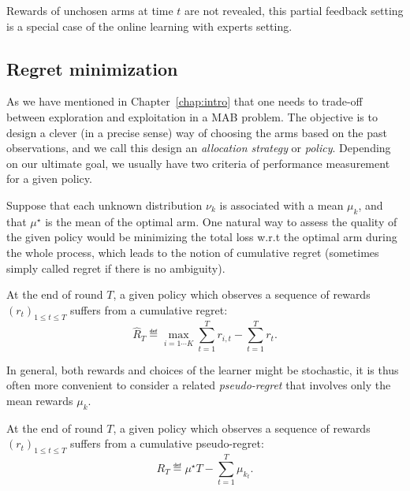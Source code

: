 \begin{remark}\label{remark:mab.partial}
\begin{leftbar}[remarkbar]
	Rewards of unchosen arms at time $t$ are not revealed, this partial feedback setting is a special case of the online learning with experts setting.
\end{leftbar}
\end{remark}

\subsection{Regret minimization}\label{sec:mab.model.regret}

As we have mentioned in Chapter~\ref{chap:intro} that one needs to trade-off between exploration and exploitation in a MAB problem. The objective is to design a clever (in a precise sense) way of choosing the arms based on the past observations, and we call this design an \emph{allocation strategy} or \emph{policy}. Depending on our ultimate goal, we usually have two criteria of performance measurement for a given policy.

Suppose that each unknown distribution $\nu_k$ is associated with a mean $\mu_k$, and that $\mu^{\star}$ is the mean of the optimal arm. One natural way to assess the quality of the given policy would be minimizing the total loss w.r.t the optimal arm during the whole process, which leads to the notion of \gls{cumulative regret} (sometimes simply called regret if there is no ambiguity).

\begin{definition}\label{def:mab.cumulative_regret}
\begin{leftbar}[defnbar]
	At the end of round $T$, a given policy which observes a sequence of rewards $(r_t)_{1 \leq t \leq T}$ suffers from a cumulative regret:
	\[
		\hat{R}_T \eqdef \max_{i=1\cdots K} \sum_{t=1}^T r_{i,t} - \sum_{t=1}^T r_t.
	\]
\end{leftbar}
\end{definition}

In general, both rewards and choices of the learner might be stochastic, it is thus often more convenient to consider a related \emph{pseudo-regret} that involves only the mean rewards $\mu_k$.

\begin{definition}\label{def:mab.pseudo_regret}
\begin{leftbar}[defnbar]
	At the end of round $T$, a given policy which observes a sequence of rewards $(r_t)_{1 \leq t \leq T}$ suffers from a cumulative pseudo-regret:
	\[
		R_T \eqdef \mu^{\star}T - \sum_{t=1}^T \mu_{k_t}.
	\]
\end{leftbar}
\end{definition}

